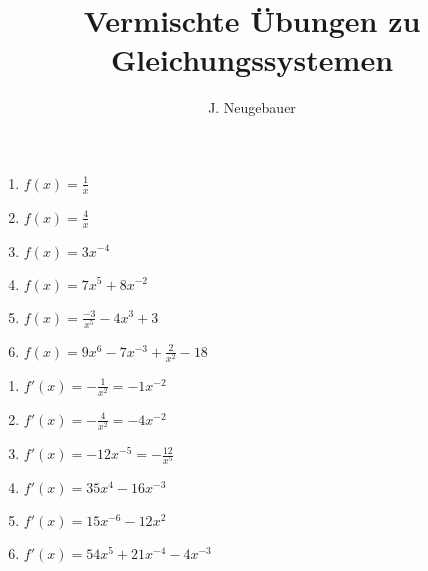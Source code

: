 \documentclass[12pt, a4paper]{scrartcl}
\author{J. Neugebauer}
\title{Vermischte Übungen zu Gleichungssystemen}
\date{\Heute}
\begin{document}
	\TITEL
	
	\begin{aufgabe}[subtitle=Bilden sie die Ableitung der Funktion]
		\begin{multicols}{2}
			\begin{enumerate}[label=\alph*)]\itemsep -2pt
				\item $f(x) = \frac{1}{x}$
				\item $f(x) = \frac{4}{x}$
				\item $f(x) = 3x^{-4}$
				\item $f(x) = 7x^5 + 8x^{-2}$
				\item $f(x) = \frac{-3}{x^5} - 4x^3 + 3$
				\item $f(x) = 9x^6 - 7x^{-3} + \frac{2}{x^2} - 18$
			\end{enumerate}
		\end{multicols}
	
		\begin{loesung}
			\begin{multicols}{2}
				\begin{enumerate}[label=\alph*)]\itemsep -2pt
					\item $f'(x) = -\frac{1}{x^2} = -1x^{-2}$
					\item $f'(x) = -\frac{4}{x^2} = -4x^{-2}$
					\item $f'(x) = -12x^{-5} = -\frac{12}{x^5}$
					\item $f'(x) = 35x^4 - 16x^{-3}$
					\item $f'(x) = 15x^{-6} - 12x^2$
					\item $f'(x) = 54x^5 + 21x^{-4} - 4x^{-3}$
				\end{enumerate}
			\end{multicols}
		\end{loesung}
	\end{aufgabe}

	\begin{aufgabe}[subtitle=,print=false]
	\end{aufgabe}
	\begin{aufgabe}[subtitle=,print=false]
	\end{aufgabe}
	\begin{aufgabe}[subtitle=,print=false]
	\end{aufgabe}
	\begin{aufgabe}[subtitle=,print=false]
	\end{aufgabe}
\end{document}
